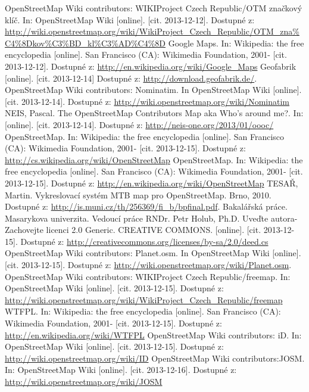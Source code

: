 \documentclass[11pt,a4paper,titlepage,oneside]{book}
\begin{document}
\begin{thebibliography}{50}
	 OpenStreetMap Wiki contributors: WIKIProject Czech Republic/OTM značkový klíč. In: OpenStreetMap Wiki [online]. [cit. 2013-12-12]. Dostupné z: 	\url{http://wiki.openstreetmap.org/wiki/WikiProject_Czech_Republic/OTM_zna%C4%8Dkov%C3%BD_kl%C3%AD%C4%8D}
	Google Maps. In: Wikipedia: the free encyclopedia [online]. San Francisco (CA): Wikimedia Foundation, 2001- [cit. 2013-12-12]. Dostupné z: \url{http://en.wikipedia.org/wiki/Google_Maps}
	Geofabrik [online]. [cit. 2013-12-14] Dostupné z: \url{http://download.geofabrik.de/}.
	OpenStreetMap Wiki contributors: Nominatim. In OpenStreetMap Wiki [online]. [cit. 2013-12-14]. Dostupné z: \url{http://wiki.openstreetmap.org/wiki/Nominatim}
	NEIS, Pascal. The OpenStreetMap Contributors Map aka Who’s around me?. In: [online]. [cit. 2013-12-14]. Dostupné z: \url{http://neis-one.org/2013/01/oooc/}
	OpenStreetMap. In: Wikipedia: the free encyclopedia [online]. San Francisco (CA): Wikimedia Foundation, 2001- [cit. 2013-12-15]. Dostupné z: \url{http://cs.wikipedia.org/wiki/OpenStreetMap}
	OpenStreetMap. In: Wikipedia: the free encyclopedia [online]. San Francisco (CA): Wikimedia Foundation, 2001- [cit. 2013-12-15]. Dostupné z: \url{http://en.wikipedia.org/wiki/OpenStreetMap}
	TESAŘ, Martin. Vykreslovací systém MTB map pro OpenStreetMap. Brno, 2010. Dostupné z: \url{http://is.muni.cz/th/256369/fi_b/bpfinal.pdf}. Bakalářská práce. Masarykova univerzita. Vedoucí práce RNDr. Petr Holub, Ph.D.
	Uveďte autora-Zachovejte licenci 2.0 Generic. CREATIVE COMMONS. [online]. [cit. 2013-12-15]. Dostupné z: \url{http://creativecommons.org/licenses/by-sa/2.0/deed.cs}
	OpenStreetMap Wiki contributors: Planet.osm. In OpenStreetMap Wiki [online]. [cit. 2013-12-15]. Dostupné z: \url{http://wiki.openstreetmap.org/wiki/Planet.osm}.
	OpenStreetMap Wiki contributors: WIKIProject Czech Republic/freemap. In: OpenStreetMap Wiki [online]. [cit. 2013-12-15]. Dostupné z:  \url{http://wiki.openstreetmap.org/wiki/WikiProject_Czech_Republic/freemap}
	 WTFPL. In: Wikipedia: the free encyclopedia [online]. San Francisco (CA): Wikimedia Foundation, 2001- [cit. 2013-12-15]. Dostupné z: \url{http://en.wikipedia.org/wiki/WTFPL}
	OpenStreetMap Wiki contributors: iD. In: OpenStreetMap Wiki [online]. [cit. 2013-12-15]. Dostupné z:  \url{http://wiki.openstreetmap.org/wiki/ID}
	OpenStreetMap Wiki contributors:JOSM. In: OpenStreetMap Wiki [online]. [cit. 2013-12-16]. Dostupné z:  \url{http://wiki.openstreetmap.org/wiki/JOSM}

\end{thebibliography}
\end{document}

